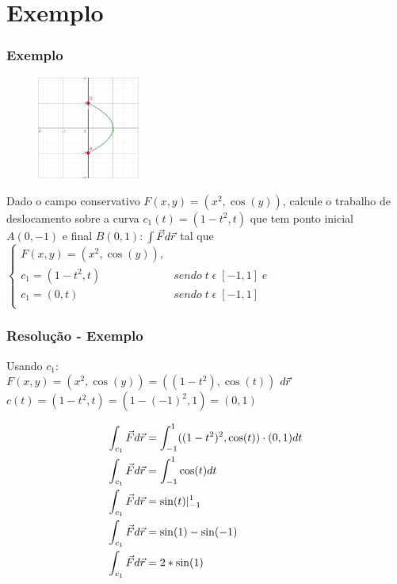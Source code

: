 \documentclass{beamer}
\def\vec{\mathaccent "017E\relax }
\begin{document}
\section{Exemplo}

\begin{frame}
    \frametitle{Exemplo} 

    \begin{figure} %
        \vspace{-35pt}
        \centering
        \caption{}
        \includegraphics[width=0.30\textwidth]{grafico-exemplo-1.png}
        \label{fig:grafico-exemplo1}
    \end{figure}

    Dado o campo conservativo $ F(x, y)=(x^2, \cos(y)) $, calcule o trabalho de deslocamento sobre a 
    curva $ c_1(t)=(1-t^2, t) $ que tem ponto inicial $ A(0, -1) $ e final $ B(0, 1) $:
    \hfill \break
    \hfill \break
    $ \int{} \vec{F} d\vec{r} $ tal que 
    $
        \begin{cases}
            F(x, y) = ( x^2, \cos(y) ),\\
            c_1 = ( 1 - t^2, t) &sendo \; t \; \epsilon \; [ -1, 1 ] \; e\\
            c_1 = ( 0, t)       &sendo \; t \; \epsilon \; [ -1, 1 ] \\
        \end{cases}
    $

\end{frame}

\begin{frame}
    \frametitle{Resolução - Exemplo} 
    Usando $ c_1 $: \\
    
    $ F(x, y) = ( x^2, \cos(y) ) = (( 1 - t^2 ), \cos(t) ) $
    \hfill \break
    $ d\vec{r} $
    \hfill \break
    $ c(t) = ( 1 - t^2, t ) = ( 1 - (-1)^2 , 1) = ( 0, 1 ) $
    \hfill \break

    \begin{align*}   
    \int_{c_1} \vec{F} d\vec{r} &= \int_{-1}^1 (( 1 - t^2)^2, \cos(t) ) \cdot ( 0, 1 ) dt \\
    \int_{c_1} \vec{F} d\vec{r} &= \int_{-1}^1 \cos(t) dt  \\
    \int_{c_1} \vec{F} d\vec{r} &= \sin(t)\vert_{-1}^{1} \\
    \int_{c_1} \vec{F} d\vec{r} &= \sin(1) - \sin(-1) \\
    \int_{c_1} \vec{F} d\vec{r} &= 2 * \sin(1) \\
    \end{align*}

\end{frame}
\end{document}
